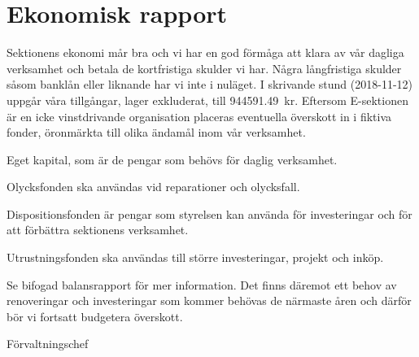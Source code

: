 \documentclass[../_main/handlingar.tex]{subfiles}
\begin{document}
\section{Ekonomisk rapport}
Sektionens ekonomi mår bra och vi har en god förmåga att klara av vår dagliga verksamhet och betala de kortfristiga skulder vi har. Några långfristiga skulder såsom banklån eller liknande har vi inte i nuläget.
I skrivande stund (2018-11-12) uppgår våra tillgångar, lager exkluderat, till \SI{944 591,49}{kr}. Eftersom E-sektionen är en icke vinstdrivande organisation placeras eventuella överskott in i fiktiva fonder, öronmärkta till olika ändamål inom vår verksamhet.
\begin{dashlist}
	\item Eget kapital, som är de pengar som behövs för daglig verksamhet.
	\item Olycksfonden ska användas vid reparationer och olycksfall.
	\item Dispositionsfonden är pengar som styrelsen kan använda för investeringar och för att förbättra sektionens verksamhet.
	\item Utrustningsfonden ska användas till större investeringar, projekt och inköp.
\end{dashlist}

Se bifogad balansrapport för mer information. Det finns däremot ett behov av renoveringar och investeringar som kommer behövas de närmaste åren och därför bör vi fortsatt budgetera överskott.

\begin{signatures}{1}
	\mvh
	\signature{Magnus Lundh}{Förvaltningschef}
\end{signatures}
\end{document}
